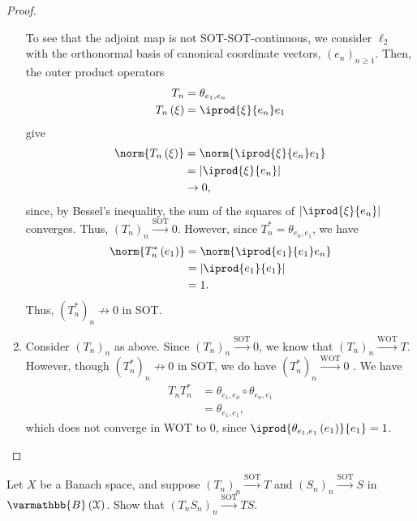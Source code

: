 \documentclass[10pt]{mypackage}
\renewcommand*{\mathbb}[1]{\varmathbb{#1}}
\newcommand{\B}{\mathbb{B}}
\begin{document}
\begin{proof}
\begin{enumerate}[(1)]
      To see that the adjoint map is not SOT-SOT-continuous, we consider $\ell_2$ with the orthonormal basis of canonical coordinate vectors, $\left(e_n\right)_{n\geq 1}$. Then, the outer product operators
      \begin{align*}
        T_n &= \theta_{e_1,e_n}\\
        T_n\left(\xi\right) &= \iprod{\xi}{e_n}e_1
      \end{align*}
      give
      \begin{align*}
        \norm{T_n\left(\xi\right)} &= \norm{ \iprod{\xi}{e_n}e_1 }\\
                                   &= \left\vert \iprod{\xi}{e_n} \right\vert\\
                                   &\rightarrow 0,
      \end{align*}
      since, by Bessel's inequality, the sum of the squares of $\left\vert \iprod{\xi}{e_n} \right\vert$ converges. Thus, $\left(T_n\right)_n\xrightarrow{\text{SOT}} 0$. However, since $T^{\ast}_{n} = \theta_{e_n,e_1}$, we have
      \begin{align*}
        \norm{T^{\ast}_{n}\left(e_1\right)} &= \norm{ \iprod{e_1}{e_1}e_n }\\
                                            &= \left\vert \iprod{e_1}{e_1} \right\vert\\
                                            &= 1.
      \end{align*}
      Thus, $\left(T_n^{\ast}\right)_{n}\not\rightarrow 0$ in SOT.
    \item Consider $\left(T_n\right)_n$ as above. Since $\left(T_n\right)_n\xrightarrow{\text{SOT}} 0$, we know that $\left(T_n\right)_n\xrightarrow{\text{WOT}}T$. However, though $\left(T_n^{\ast}\right)_n\not\rightarrow0$ in SOT, we do have $\left(T_n^{\ast}\right)_n\xrightarrow{\text{WOT}}0$ . We have
      \begin{align*}
        T_nT_n^{\ast} &= \theta_{e_1,e_n}\circ \theta_{e_n,e_1}\\
                      &= \theta_{e_1,e_1},
      \end{align*}
      which does not converge in WOT to $0$, since $ \iprod{\theta_{e_1,e_1}\left(e_1\right)}{e_1} = 1 $.
  \end{enumerate}
\end{proof}
\begin{exercise}
  Let $X$ be a Banach space, and suppose $\left(T_n\right)_n\xrightarrow{\text{SOT}}T$ and $\left(S_n\right)_n\xrightarrow{\text{SOT}}S$ in $\B\left(\mathcal{X}\right)$. Show that $\left(T_nS_n\right)_n\xrightarrow{\text{SOT}}TS$.
\end{exercise}
\end{document}
